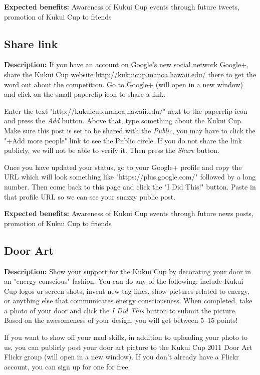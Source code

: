 \vspace{2ex}
\textbf{Expected benefits:} Awareness of Kukui Cup events through future tweets, promotion of Kukui Cup to friends


\subsection{Share link}

\textbf{Description:} If you have an account on Google's new social network Google+, share the Kukui Cup website \url{http://kukuicup.manoa.hawaii.edu/} there to get the word out about the competition. Go to Google+ (will open in a new window) and click on the small paperclip icon to share a link.

Enter the text "http://kukuicup.manoa.hawaii.edu/" next to the paperclip icon and press the \emph{Add} button. Above that, type something about the Kukui Cup. Make sure this post is set to be shared with the \emph{Public}, you may have to click the "+Add more people" link to see the Public circle. If you do not share the link publicly, we will not be able to verify it. Then press the \emph{Share} button.

Once you have updated your status, go to your Google+ profile and copy the URL which will look something like "https://plus.google.com/" followed by a long number. Then come back to this page and click the "I Did This!" button. Paste in that profile URL so we can see your snazzy public post.

\vspace{2ex}
\textbf{Expected benefits:} Awareness of Kukui Cup events through future news posts, promotion of Kukui Cup to friends


\subsection{Door Art}

\textbf{Description:} Show your support for the Kukui Cup by decorating your door in an "energy conscious" fashion. You can do any of the following: include Kukui Cup logos or screen shots, invent new tag lines, show pictures related to energy, or anything else that communicates energy consciousness. When completed, take a photo of your door and click the \emph{I Did This} button to submit the picture. Based on the awesomeness of your design, you will get between 5--15 points!

If you want to show off your mad skillz, in addition to uploading your photo to us, you can publicly post your door art picture to the Kukui Cup 2011 Door Art Flickr group (will open in a new window). If you don't already have a Flickr account, you can sign up for one for free.


